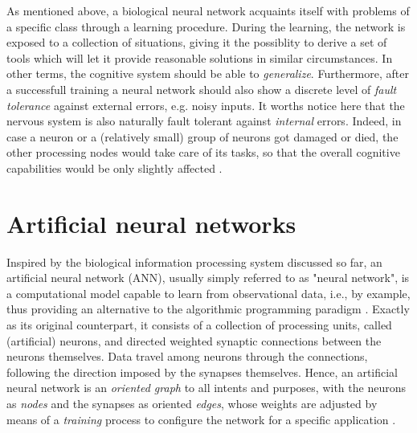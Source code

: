 \documentclass[12pt, a4paper, twoside, openright]{report}
\numberwithin{equation}{chapter}
\theoremstyle{theorem}
\theoremstyle{definition}
\theoremstyle{remark}
\theoremstyle{proposition}
\numberwithin{figure}{chapter}
\begin{document}
		 As mentioned above, a biological neural network acquaints itself with problems of a specific class through a learning procedure. During the learning, the network is exposed to a collection of situations, giving it the possiblity to derive a set of tools which will let it provide reasonable solutions in similar circumstances. In other terms, the cognitive system should be able to \emph{generalize}. Furthermore, after a successfull training a neural network should also show a discrete level of \emph{fault tolerance} against external errors, e.g. noisy inputs. It worths notice here that the nervous system is also naturally fault tolerant against \emph{internal} errors. Indeed, in case a neuron or a (relatively small) group of neurons got damaged or died, the other processing nodes would take care of its tasks, so that the overall cognitive capabilities would be only slightly affected \cite{Kri}. 
		 
		 
	\vspace*{0.3cm}
		 		
	\section{Artificial neural networks}
	\label{section:Artificial neural networks}
				
		Inspired by the biological information processing system discussed so far, an artificial neural network (ANN), usually simply referred to as "neural network", is a computational model capable to learn from observational data, i.e., by example, thus providing an alternative to the algorithmic programming paradigm \cite{Nie15}. Exactly as its original counterpart, it consists of a collection of processing units, called (artificial) neurons, and directed weighted synaptic connections between the neurons themselves. Data travel among neurons through the connections, following the direction imposed by the synapses themselves. Hence, an artificial neural network is an \emph{oriented graph} to all intents and purposes, with the neurons as \emph{nodes} and the synapses as oriented \emph{edges}, whose weights are adjusted by means of a \emph{training} process to configure the network for a specific application \cite{SD13}. 
		
\end{document}
